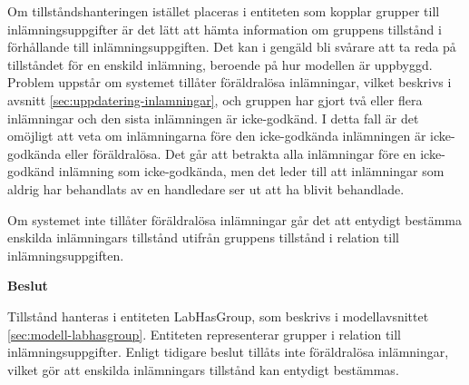 Om tillståndshanteringen istället placeras i entiteten som kopplar grupper till inlämningsuppgifter är det lätt att hämta information om gruppens tillstånd i förhållande till inlämningsuppgiften. Det kan i gengäld bli svårare att ta reda på tillståndet för en enskild inlämning, beroende på hur modellen är uppbyggd. Problem uppstår om systemet tillåter föräldralösa inlämningar, vilket beskrivs i avsnitt \ref{sec:uppdatering-inlamningar}, och gruppen har gjort två eller flera inlämningar och den sista inlämningen är icke-godkänd. I detta fall är det omöjligt att veta om inlämningarna före den icke-godkända inlämningen är icke-godkända eller föräldralösa. Det går att betrakta alla inlämningar före en icke-godkänd inlämning som icke-godkända, men det leder till att inlämningar som aldrig har behandlats av en handledare ser ut att ha blivit behandlade.

Om systemet inte tillåter föräldralösa inlämningar går det att entydigt bestämma enskilda inlämningars tillstånd utifrån gruppens tillstånd i relation till inlämningsuppgiften.

\begin{flushright}

  \textbf{Beslut}

  Tillstånd hanteras i entiteten LabHasGroup, som beskrivs i modellavsnittet \ref{sec:modell-labhasgroup}. Entiteten representerar grupper i relation till inlämningsuppgifter. Enligt tidigare beslut tillåts inte föräldralösa inlämningar, vilket gör att enskilda inlämningars tillstånd kan entydigt bestämmas.
\end{flushright}

